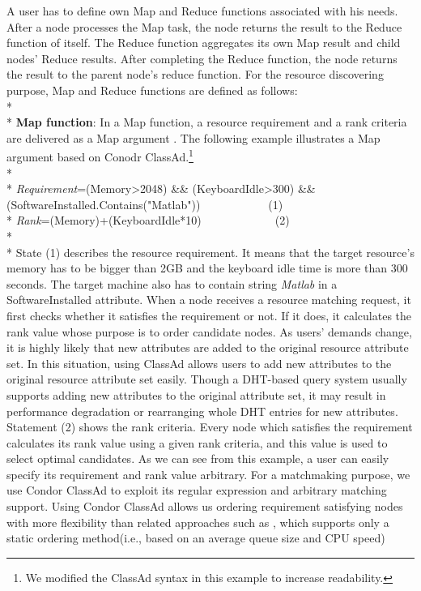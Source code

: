 \documentclass{acm_proc_article-sp}
\begin{document}
A user has to define own Map and Reduce functions associated with his needs. 
After a node processes the Map task, the node returns the result to the Reduce function of itself.
The Reduce function aggregates its own Map result and child nodes' Reduce results. 
After completing the Reduce function, the node returns the result to the parent node's reduce function.
For the resource discovering purpose, Map and Reduce functions are defined as follows:\\*\\*
\textbf{Map function}: In a Map function, a resource requirement and a rank criteria are delivered as a Map argument .
The following example illustrates a Map argument based on Conodr ClassAd.\footnote{We modified the ClassAd syntax in this example to increase readability.}\\*\\*
\textit{Requirement}=(Memory>2048) \&\& (KeyboardIdle>300) \&\& (SoftwareInstalled.Contains("Matlab"))\ \ \ \ \ \ \ \ \ \ \ \ (1)\\*
\textit{Rank}=(Memory)+(KeyboardIdle*10)\ \ \ \ \ \ \ \ \ \ \ \ \ (2)\\*\\*
State (1) describes the resource requirement. It means that the target resource's memory has to be bigger than 2GB and the keyboard idle time is more than 300 seconds.
The target machine also has to contain string \textit{Matlab} in a SoftwareInstalled attribute.
When a node receives a resource matching request, it first checks whether it satisfies the requirement or not. If it does, it calculates the rank value whose purpose is to order candidate nodes.
As users' demands change, it is highly likely that new attributes are added to the original resource attribute set. 
In this situation, using ClassAd allows users to add new attributes to the original resource attribute set easily.
Though a DHT-based query system usually supports adding new attributes to the original attribute set, it may result in performance degradation or rearranging whole DHT entries for new attributes.
Statement (2) shows the rank criteria. Every node which satisfies the requirement calculates its rank value using a given rank criteria, and this value is used to select optimal candidates.
As we can see from this example, a user can easily specify its requirement and rank value arbitrary.
For a matchmaking purpose, we use Condor ClassAd\cite{classad} to exploit its regular expression and arbitrary matching support.
Using Condor ClassAd allows us ordering requirement satisfying nodes with more flexibility than related approaches such as \cite{can_query}, which supports only a static ordering method(i.e., based on an average queue size and CPU speed)
\end{document}
